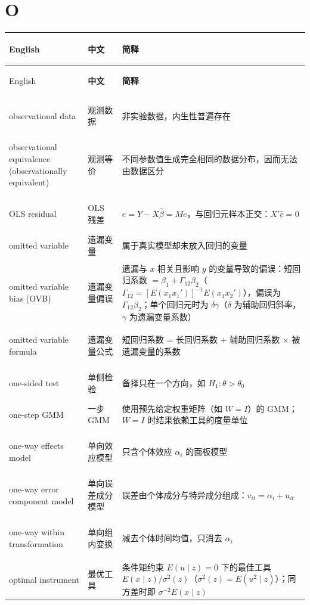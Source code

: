 \par{}\ifdim\dimexpr\pagegoal-\pagetotal\relax<16\baselineskip\newpage\fi
\section*{O}
\begin{longtable}{@{}>{\bfseries\boldmath\raggedright\arraybackslash}p{4.6cm}>{\raggedright\arraybackslash}p{3.2cm}>{\raggedright\arraybackslash}p{\dimexpr\textwidth-7.8cm-4\tabcolsep\relax}@{}}
\toprule
English & \textbf{中文} & \textbf{简释}\\
\midrule
\endfirsthead
\toprule
English & \textbf{中文} & \textbf{简释}\\
\midrule
\endhead
\midrule
\multicolumn{3}{r@{}}{\footnotesize\itshape （续下页）}\\
\endfoot
\bottomrule
\endlastfoot
observational data & 观测数据 & 非实验数据，内生性普遍存在 \\
observational equivalence (observationally equivalent) & 观测等价 & 不同参数值生成完全相同的数据分布，因而无法由数据区分 \\
OLS residual & OLS 残差 & $\hat e=Y-X\hat\beta=Me$，与回归元样本正交：$X'\hat e=0$ \\
omitted variable & 遗漏变量 & 属于真实模型却未放入回归的变量 \\
omitted variable bias (OVB) & 遗漏变量偏误 & 遗漏与 $x$ 相关且影响 $y$ 的变量导致的偏误：短回归系数 $=\beta_1+\Gamma_{12}\beta_2$（$\Gamma_{12}=[E(x_1x_1')]^{-1}E(x_1x_2')$），偏误为 $\Gamma_{12}\beta_2$；单个回归元时为 $\delta\gamma$（$\delta$ 为辅助回归斜率，$\gamma$ 为遗漏变量系数） \\
omitted variable formula & 遗漏变量公式 & 短回归系数 = 长回归系数 + 辅助回归系数 $\times$ 被遗漏变量的系数 \\
one-sided test & 单侧检验 & 备择只在一个方向，如 $H_1:\theta>\theta_0$ \\
one-step GMM & 一步 GMM & 使用预先给定权重矩阵（如 $W=I$）的 GMM；$W=I$ 时结果依赖工具的度量单位 \\
one-way effects model & 单向效应模型 & 只含个体效应 $\alpha_i$ 的面板模型 \\
one-way error component model & 单向误差成分模型 & 误差由个体成分与特异成分组成：$v_{it}=\alpha_i+u_{it}$ \\
one-way within transformation & 单向组内变换 & 减去个体时间均值，只消去 $\alpha_i$ \\
optimal instrument & 最优工具 & 条件矩约束 $E(u\mid z)=0$ 下的最佳工具 $E(x\mid z)/\sigma^2(z)$（$\sigma^2(z)=E(u^2\mid z)$）；同方差时即 $\sigma^{-2}E(x\mid z)$ \\

\end{longtable}
